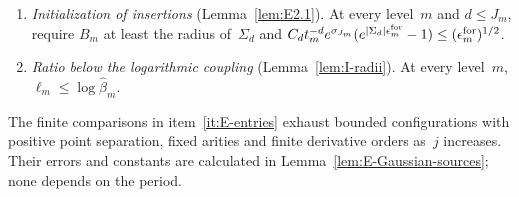 \begin{enumerate}
\begin{equation}\label{eq:E-Gaussian-entry}
 \mathsf w_t^n\mathcal C_j^{h_t(b)+v_t+2}\mathcal E_t^{\rm G}\le1,
 \qquad Q_j^{\rm cmp}\le\log\cutoffsize_t/(16n),
 \qquad \widehat\beta_i\in[\widehat\beta_t/2,\widehat\beta_t]\quad(k_t\le i\le t).
\end{equation}
Here $Q_j^{\rm cmp}$ is the stage normalization constant in~\eqref{eq:E-comparison-cost}, enlarged to cover the source modes and amplitudes of the finitely many arity bounds $n\ge2$ used at stage~$j$, and the second bound is required for each of these~$n$. These constants are fixed first; the entry is then raised until $\log\cutoffsize_t\ge16n\,Q_j^{\rm cmp}$. The first bound is imposed with the stronger smallness used in~\eqref{eq:E-source-iteration}. The entry also meets the local marked bound in item~\ref{it:E-graph}, the forced-source bounds at every exponent between $98$ and $100$, and~\eqref{eq:E-attachment-allowance}--\eqref{eq:E-source-allowance-transport}. The unmarked attachment sum in Lemma~\ref{lem:D-connected} is at most $\eta^{\rm att}_i/2$, and $64\log\widehat\beta_{i+1}/B_i\le1/4$.
\item\label{it:E-birth} \emph{Initialization of insertions} (Lemma~\ref{lem:E2.1}). At every level~$m$ and $d\le J_m$, require $B_m$ at least the radius of~$\Sigma_d$ and $C_dt_m^{-d}e^{\sigma_{J_m}}(e^{|\Sigma_d|\epsilon_m^{\rm for}}-1)\le(\epsilon_m^{\rm for})^{1/2}$.
\item\label{it:E-ratio-log} \emph{Ratio below the logarithmic coupling} (Lemma~\ref{lem:I-radii}). At every level~$m$, $\ell_m\le\log\widehat\beta_m$.
\end{enumerate}
The finite comparisons in item~\ref{it:E-entries} exhaust bounded configurations with positive point separation, fixed arities and finite derivative orders as~$j$ increases. Their errors and constants are calculated in Lemma~\ref{lem:E-Gaussian-sources}; none depends on the period.

